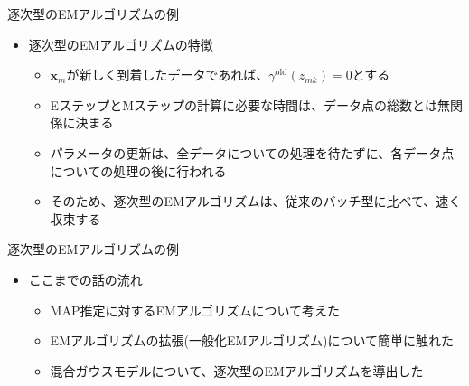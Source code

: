 \documentclass[dvipdfmx,notheorems,t]{beamer}
\begin{document}
\begin{frame}{逐次型のEMアルゴリズムの例}
\begin{itemize}
	\item 逐次型のEMアルゴリズムの特徴
	\begin{itemize}
		\item $\bm{x}_m$が新しく到着したデータであれば、$\gamma^\mathrm{old}(z_{mk}) = 0$とする
		\newline
		\item EステップとMステップの計算に必要な時間は、データ点の総数とは無関係に決まる
		\item パラメータの更新は、全データについての処理を待たずに、各データ点についての処理の後に行われる
		\item そのため、逐次型のEMアルゴリズムは、従来のバッチ型に比べて、\alert{速く収束する}
	\end{itemize}
\end{itemize}

\end{frame}

\begin{frame}{逐次型のEMアルゴリズムの例}

\begin{itemize}
	\item ここまでの話の流れ
	\begin{itemize}
		\item \alert{MAP推定}に対するEMアルゴリズムについて考えた
		\item EMアルゴリズムの拡張(\alert{一般化EMアルゴリズム})について簡単に触れた
		\item 混合ガウスモデルについて、\alert{逐次型}のEMアルゴリズムを導出した
	\end{itemize}
\end{itemize}

\end{frame}
\end{document}
